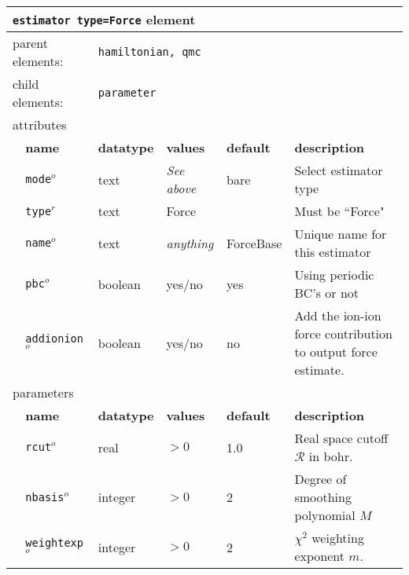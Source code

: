 \begin{table}[h]
\begin{center}
\begin{tabularx}{\textwidth}{l l l l l l }
\hline
\multicolumn{6}{l}{\texttt{estimator type=Force} element} \\
\hline
\multicolumn{2}{l}{parent elements:} & \multicolumn{4}{l}{\texttt{hamiltonian, qmc}}\\
\multicolumn{2}{l}{child  elements:} & \multicolumn{4}{l}{\texttt{parameter}}\\
\multicolumn{2}{l}{attributes}  & \multicolumn{4}{l}{}\\
   & \bfseries name       & \bfseries datatype & \bfseries values  & \bfseries default   & \bfseries description \\
   &   \texttt{mode}$^o$      &  text              & \textit{See above}        & bare          & Select estimator type\\
   &   \texttt{type}$^r$      &  text              &  Force            &               & Must be ``Force"         \\
   &   \texttt{name}$^o$      &  text              & \textit{anything}         & ForceBase     & Unique name for this estimator\\
   &   \texttt{pbc}$^o$       &  boolean           & yes/no                    & yes           & Using periodic BC's or not\\
   &   \texttt{addionion}$^o$       &  boolean           & yes/no                    & no           & Add the ion-ion force contribution to output force estimate.   \\
   \multicolumn{2}{l}{parameters}  & \multicolumn{4}{l}{}\\
   & \bfseries name       & \bfseries datatype & \bfseries values  & \bfseries default   & \bfseries description \\
   &   \texttt{rcut}$^o$      &  real             & $> 0$        & 1.0         & Real space cutoff $\mathcal{R}$ in bohr.\\
   &   \texttt{nbasis}$^o$      &  integer              & $> 0 $           &  2            & Degree of smoothing polynomial $M$ \\
   &   \texttt{weightexp}$^o$      &  integer              &$ > 0$         & 2    & $\chi^2$ weighting exponent $m$.\\  
  \hline
\end{tabularx}
\end{center}
\end{table}
\FloatBarrier

